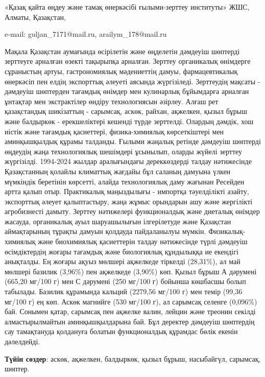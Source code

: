 \begin{affiliation}
«Қазақ қайта өңдеу және тамақ өнеркәсібі ғылыми-зерттеу институты» ЖШС,
Алматы, Қазақстан,

e-mail: guljan\_7171@mail.ru, arailym\_178@mail.ru
\end{affiliation}

Мақала Қазақстан аумағында өсірілетін және өңделетін дәмдеуіш шөптерді
зерттеуге арналған өзекті тақырыпқа арналған. Зерттеу органикалық
өнімдерге сұраныстың артуы, гастрономиялық мәдениеттің дамуы,
фармацевтикалық өнеркәсіп пен елдің экспорттық әлеуеті аясында
жүргізіледі. Зерттеудің мақсаты - дәмдеуіш шөптерден тағамдық өнімдер
мен кулинарлық бұйымдарға арналған ұнтақтар мен экстрактілер өндіру
технологиясын әзірлеу. Алғаш рет қазақстандық шикізаттың - сарымсақ,
аскөк, райхан, ақжелкен, қызыл бұрыш және балдыркөк - ерекшеліктері
кешенді түрде зерттелді. Олардың дәмдік, хош иістік және тағамдық
қасиеттері, физика-химиялық көрсеткіштері мен аминқышқылдық құрамы
талданды. Ғылыми жаңалық ретінде дәмдеуіш шөптерді өңдеудің жаңа
технологиялық шешімдері ұсынылып, оларды жүйелі зерттеу жүргізілді.
1994-2024 жылдар аралығындағы дереккөздерді талдау нәтижесінде
Қазақстанның қолайлы климаттық жағдайы бұл саланың дамуына үлкен
мүмкіндік беретінін көрсетті, алайда технологиялық даму жағынан Ресейден
артта қалып отыр. Практикалық маңыздылығы - импортқа тәуелділікті
азайту, экспорттық әлеует қалыптастыру, жаңа жұмыс орындарын ашу және
жергілікті агробизнесті дамыту. Зерттеу нәтижелері функционалдық және
диеталық өнімдер жасауда, органикалық ауыл шаруашылығын ілгерілетуде
және Қазақстан аймақтарының тұрақты дамуын қолдауда пайдаланылуы мүмкін.
Физикалық-химиялық және биохимиялық қасиеттерін талдау нәтижесінде түрлі
дәмдеуіш өсімдіктердің жоғары тағамдық және биологиялық құндылыққа ие
екендігі анықталды. Ең жоғары ақуыз мөлшері ақжелкеде тіркелді
(28,31\%), ал май мөлшері базилик (3,96\%) пен ақжелкеде (3,90\%) көп.
Қызыл бұрыш А дәрумені (665,20 мг/100 г) мен С дәрумені (250 мг/100 г)
бойынша көшбасшы болып табылады. Базилик құрамында кальций (2279,56
мг/100 г) мен темір (99,36 мг/100 г) ең көп. Аскөк магнийге (530 мг/100
г), ал сарымсақ селенге (0,096\%) бай. Сонымен қатар, сарымсақ пен
ақжелке валин, лейцин және треонин секілді алмастырылмайтын
аминқышқылдарына бай. Бұл деректер дәмдеуіш шөптердің сау тамақтануда
қолдануға болатын функционалдық құрамдас бөлік екенін дәлелдейді.

{\bfseries Түйін сөздер}: аскөк, ақжелкен, балдыркөк, қызыл бұрыш,
насыбайгүл, сарымсақ, шөптер.

